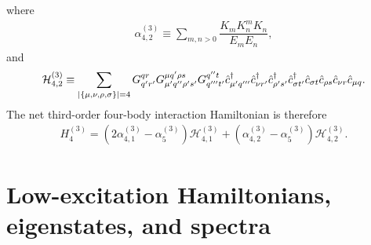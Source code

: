 \documentclass[preprint,showkeys,nofootinbib]{revtex4-1}
\newcommand{\f}{\dfrac} %
\newcommand{\p}[1]{\left(#1\right)} %
\renewcommand{\set}[1]{\left\{#1\right\}} %
\renewcommand{\c}{\hat{c}}
\renewcommand{\H}{\mathcal{H}}
\newcommand{\1}{\mathds{1}}
\begin{document}
where
\begin{align}
  \alpha_{4,2}^{(3)}
  \equiv \sum_{m,n>0} \f{K_m K^m_n K_n}{E_m E_n},
\end{align}
and
\begin{align}
  \H_{4,2}^{(3)}
  \equiv \sum_{\abs{\set{\mu,\nu,\rho,\sigma}}=4}
  G^{qr}_{q'r'} G^{\mu q'\rho s}_{\mu'q''\rho's'} G^{q''t}_{q'''t'}
  \c_{\mu'q'''}^\dag \c_{\nu r'}^\dag \c_{\rho's'}^\dag \c_{\sigma t'}^\dag
  \c_{\sigma t} \c_{\rho s} \c_{\nu r} \c_{\mu q}.
\end{align}
The net third-order four-body interaction Hamiltonian is therefore
\begin{align}
  H_4^{(3)}
  = \p{2\alpha_{4,1}^{(3)} - \alpha_5^{(3)}} \H_{4,1}^{(3)}
  + \p{\alpha_{4,2}^{(3)} - \alpha_5^{(3)}} \H_{4,2}^{(3)}.
  \label{eq:H_4_3}
\end{align}


\section{Low-excitation Hamiltonians, eigenstates, and spectra}
\label{sec:spectra}
\end{document}
